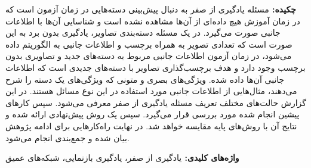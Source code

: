 {\bf {چکيده: }}
مسئله یادگیری از صفر
به دنبال پیش‌بینی دسته‌هایی در زمان آزمون است که در زمان آموزش هیچ داده‌ای از آن‌ها مشاهده نشده است و شناسایی آن‌ها با اطلاعات جانبی صورت می‌گیرد. در یک مسئله دسته‌بندی تصاویر، یادگیری بدون برد به این صورت است که تعدادی تصویر به همراه برچسب و اطلاعات جانبی به الگوریتم داده می‌شود، در زمان آزمون  اطلاعات جانبی مربوط به دسته‌های جدید و تصاویری بدون برچسب وجود دارد و هدف برچسب‌گذاری تصاویر با دسته‌های جدیدی است که اطلاعات جانبی آن‌ها داده شده. ویژگی‌های بصری و متونی که ویژگی‌های یک دسته را شرح می‌دهند، مثال‌هایی از اطلاعات جانبی مورد استفاده در این نوع مسائل هستند. 
در این گزارش حالت‌های مختلف تعریف مسئله یادگیری از صفر معرفی می‌شود. سپس کارهای پیشین انجام شده مورد بررسی قرار می‌گیرد. سپس یک روش پیش‌نهادی ارائه شده و  نتایج آن با روش‌های پایه مقایسه خواهد شد. در نهایت راه‌کارهایی برای ادامه پژوهش بیان شده و جمع‌بندی انجام می‌شود. 

{\bf  { واژه‌های کلیدی: }}
یادگیری از صفر، یادگیری بازنمایی، شبکه‌های عمیق

